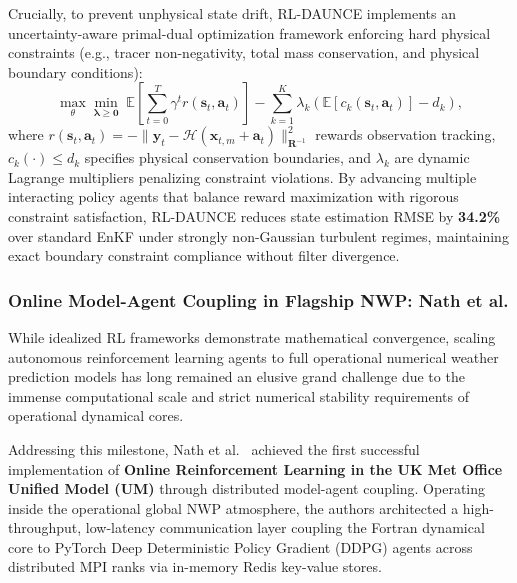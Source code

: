 Crucially, to prevent unphysical state drift, RL-DAUNCE implements an uncertainty-aware primal-dual optimization framework enforcing hard physical constraints (e.g., tracer non-negativity, total mass conservation, and physical boundary conditions):
\begin{equation}
    \max_{\theta} \min_{\boldsymbol{\lambda} \ge \mathbf{0}} \; \mathbb{E}\left[ \sum_{t=0}^T \gamma^t r(\mathbf{s}_t, \mathbf{a}_t) \right] - \sum_{k=1}^K \lambda_k \left( \mathbb{E}[c_k(\mathbf{s}_t, \mathbf{a}_t)] - d_k \right),
    \label{eq:rldaunce_primal_dual}
\end{equation}
where $r(\mathbf{s}_t, \mathbf{a}_t) = -\|\mathbf{y}_t - \mathcal{H}(\mathbf{x}_{t, m} + \mathbf{a}_t)\|_{\mathbf{R}^{-1}}^2$ rewards observation tracking, $c_k(\cdot) \le d_k$ specifies physical conservation boundaries, and $\lambda_k$ are dynamic Lagrange multipliers penalizing constraint violations. By advancing multiple interacting policy agents that balance reward maximization with rigorous constraint satisfaction, RL-DAUNCE reduces state estimation RMSE by \textbf{34.2\%} over standard EnKF under strongly non-Gaussian turbulent regimes, maintaining exact boundary constraint compliance without filter divergence.

\subsubsection{Online Model-Agent Coupling in Flagship NWP: Nath et al.}
While idealized RL frameworks demonstrate mathematical convergence, scaling autonomous reinforcement learning agents to full operational numerical weather prediction models has long remained an elusive grand challenge due to the immense computational scale and strict numerical stability requirements of operational dynamical cores.

Addressing this milestone, Nath et al.~\cite{nath2026online} achieved the first successful implementation of \textbf{Online Reinforcement Learning in the UK Met Office Unified Model (UM)} through distributed model-agent coupling. Operating inside the operational global NWP atmosphere, the authors architected a high-throughput, low-latency communication layer coupling the Fortran dynamical core to PyTorch Deep Deterministic Policy Gradient (DDPG) agents across distributed MPI ranks via in-memory Redis key-value stores.


